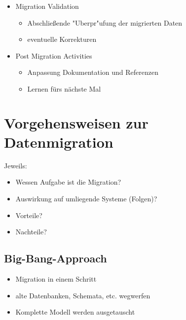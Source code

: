 \documentclass[11pt]{scrartcl}
\begin{document}
\begin{itemize}
\begin{itemize}
		\item Migration Validation
		\begin{itemize}
			\item Abschließende "Uberpr"ufung der migrierten Daten
			\item eventuelle Korrekturen
		\end{itemize}
		
		\item Post Migration Activities
		\begin{itemize}
			\item Anpassung Dokumentation und Referenzen
			\item Lernen fürs nächste Mal
		\end{itemize}
		
	\end{itemize}
\end{itemize}

\section{Vorgehensweisen zur Datenmigration}

Jeweils:
\begin{itemize}
	\item Wessen Aufgabe ist die Migration?
	\item Auswirkung auf umliegende Systeme (Folgen)?
	\item Vorteile?
	\item Nachteile?
\end{itemize}

\subsection{Big-Bang-Approach}

\begin{itemize}
	\item Migration in einem Schritt
	\item alte Datenbanken, Schemata, etc. wegwerfen
	\item Komplette Modell werden ausgetauscht
\end{itemize}
\end{document}
